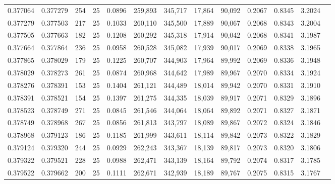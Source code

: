 \begin{tabular}{rrrrrrrrrrrrr}
0.377064 & 0.377279 &   254 &  25 &                                     0.0896 & 259,893 & 345,717 &  17,864 &  90,092 & 0.2067 & 0.8345 & 3.2024 \\
0.377279 & 0.377503 &   217 &  25 &                                     0.1033 & 260,110 & 345,500 &  17,889 &  90,067 & 0.2068 & 0.8343 & 3.2004 \\
0.377505 & 0.377663 &   182 &  25 &                                     0.1208 & 260,292 & 345,318 &  17,914 &  90,042 & 0.2068 & 0.8341 & 3.1987 \\
0.377664 & 0.377864 &   236 &  25 &                                     0.0958 & 260,528 & 345,082 &  17,939 &  90,017 & 0.2069 & 0.8338 & 3.1965 \\
0.377865 & 0.378029 &   179 &  25 &                                     0.1225 & 260,707 & 344,903 &  17,964 &  89,992 & 0.2069 & 0.8336 & 3.1948 \\
0.378029 & 0.378273 &   261 &  25 &                                     0.0874 & 260,968 & 344,642 &  17,989 &  89,967 & 0.2070 & 0.8334 & 3.1924 \\
0.378276 & 0.378391 &   153 &  25 &                                     0.1404 & 261,121 & 344,489 &  18,014 &  89,942 & 0.2070 & 0.8331 & 3.1910 \\
0.378391 & 0.378521 &   154 &  25 &                                     0.1397 & 261,275 & 344,335 &  18,039 &  89,917 & 0.2071 & 0.8329 & 3.1896 \\
0.378523 & 0.378749 &   271 &  25 &                                     0.0845 & 261,546 & 344,064 &  18,064 &  89,892 & 0.2071 & 0.8327 & 3.1871 \\
0.378749 & 0.378968 &   267 &  25 &                                     0.0856 & 261,813 & 343,797 &  18,089 &  89,867 & 0.2072 & 0.8324 & 3.1846 \\
0.378968 & 0.379123 &   186 &  25 &                                     0.1185 & 261,999 & 343,611 &  18,114 &  89,842 & 0.2073 & 0.8322 & 3.1829 \\
0.379124 & 0.379320 &   244 &  25 &                                     0.0929 & 262,243 & 343,367 &  18,139 &  89,817 & 0.2073 & 0.8320 & 3.1806 \\
0.379322 & 0.379521 &   228 &  25 &                                     0.0988 & 262,471 & 343,139 &  18,164 &  89,792 & 0.2074 & 0.8317 & 3.1785 \\
0.379522 & 0.379662 &   200 &  25 &                                     0.1111 & 262,671 & 342,939 &  18,189 &  89,767 & 0.2075 & 0.8315 & 3.1767 \\

\end{tabular}
